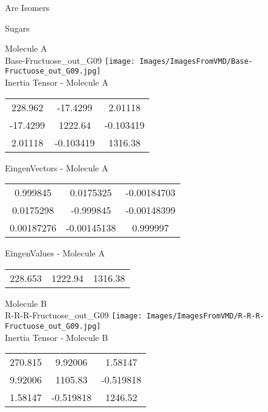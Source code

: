 \begin{center}
\vtab
\vtab
\textcolor{NavyBlue}{\Large Are Isomers}
\end{center}
\newpage

\vtab[-2cm]
\begin{center}
{\large Sugars}
\end{center}
\begin{multicols}{2}
\begin{center}
Molecule A \\ 
Base-Fructuose\_out\_G09
\texttt{[image: Images/ImagesFromVMD/Base-Fructuose\_out\_G09.jpg]}
\\
Inertia Tensor - Molecule A \\
\vtab
\begin{tabular}{|c c c|}
228.962	 & 	-17.4299	 & 	2.01118	 \\
-17.4299	 & 	1222.64	 & 	-0.103419	 \\
2.01118	 & 	-0.103419	 & 	1316.38
\end{tabular}

\vtab
 EingenVectors - Molecule A     \\
\vtab
\begin{tabular}{|c c c|}
0.999845	 & 	0.0175325	 & 	-0.00184703	 \\
0.0175298	 & 	-0.999845	 & 	-0.00148399	 \\
0.00187276	 & 	-0.00145138	 & 	0.999997
\end{tabular}

\vtab
 EingenValues - Molecule A     \\
\vtab
\begin{tabular}{|c c c|}
228.653	 & 	1222.94	 & 	1316.38
\end{tabular}
\columnbreak

Molecule B \\ 
R-R-R-Fructuose\_out\_G09
\texttt{[image: Images/ImagesFromVMD/R-R-R-Fructuose\_out\_G09.jpg]}
\\
Inertia Tensor - Molecule B \\
\vtab
\begin{tabular}{|c c c|}
270.815	 & 	9.92006	 & 	1.58147	 \\
9.92006	 & 	1105.83	 & 	-0.519818	 \\
1.58147	 & 	-0.519818	 & 	1246.52
\end{tabular}


\end{center}
\end{multicols}
